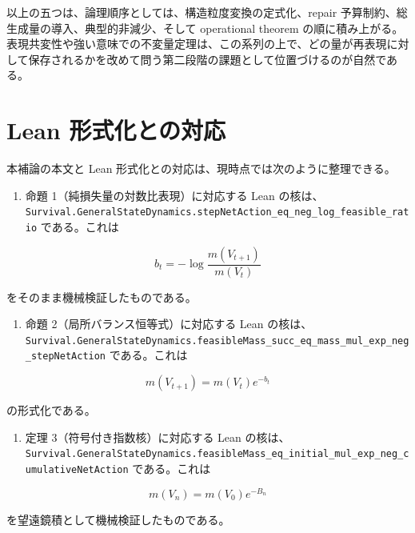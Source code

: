 \documentclass[12pt,a4paper]{article}
\begin{document}
以上の五つは、論理順序としては、構造粒度変換の定式化、repair 予算制約、総生成量の導入、典型的非減少、そして operational theorem の順に積み上がる。表現共変性や強い意味での不変量定理は、この系列の上で、どの量が再表現に対して保存されるかを改めて問う第二段階の課題として位置づけるのが自然である。

\section{Lean 形式化との対応}\label{lean-ux5f62ux5f0fux5316ux3068ux306eux5bfeux5fdc}

本補論の本文と Lean 形式化との対応は、現時点では次のように整理できる。

\begin{enumerate}
\def\labelenumi{\arabic{enumi}.}
\tightlist
\item
  命題 1（純損失量の対数比表現）に対応する Lean の核は、\texttt{Survival.GeneralStateDynamics.stepNetAction\_eq\_neg\_log\_feasible\_ratio} である。これは
\end{enumerate}

\[
b_{t} = -\log \frac{m(V_{t+1})}{m(V_{t})}
\]

をそのまま機械検証したものである。

\begin{enumerate}
\def\labelenumi{\arabic{enumi}.}
\setcounter{enumi}{1}
\tightlist
\item
  命題 2（局所バランス恒等式）に対応する Lean の核は、\texttt{Survival.GeneralStateDynamics.feasibleMass\_succ\_eq\_mass\_mul\_exp\_neg\_stepNetAction} である。これは
\end{enumerate}

\[
m(V_{t+1}) = m(V_{t}) e^{-b_{t}}
\]

の形式化である。

\begin{enumerate}
\def\labelenumi{\arabic{enumi}.}
\setcounter{enumi}{2}
\tightlist
\item
  定理 3（符号付き指数核）に対応する Lean の核は、\texttt{Survival.GeneralStateDynamics.feasibleMass\_eq\_initial\_mul\_exp\_neg\_cumulativeNetAction} である。これは
\end{enumerate}

\[
m(V_{n}) = m(V_0) e^{-B_{n}}
\]

を望遠鏡積として機械検証したものである。
\end{document}
